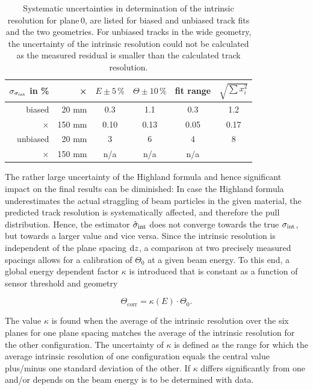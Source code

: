 \begin{table}[tbp]
 \begin{center}
  \begin{tabular}{r|r|c|c|c||c}
  $\sigma_{\sigma_{\textrm{int}}}$ in \% & × & $E\pm5\,\%$ & $\Theta\pm10\,\%$ & fit range & $\sqrt{\sum x_i^2}$\\ \hline
  biased   &  20 mm & 0.3 & 1.1  & 0.3 & 1.2 \\
  ×        & 150 mm & 0.10 & 0.13 & 0.05 & 0.17\\
  unbiased &  20 mm &   3 & 6    & 4  & 8\\
  ×        & 150 mm & n/a & n/a  & n/a & \\
  \end{tabular}
    \caption[Systematic uncertainties for plane\,0]{Systematic uncertainties in determination of the intrinsic resolution for plane\,0, are listed for biased and unbiased track fits and the two geometries.
  For unbiased tracks in the wide geometry, the uncertainty of the intrinsic resolution could not be calculated as the measured residual is smaller than the calculated track resolution.}
  \label{tab:uncerts}
 \end{center}
\end{table}

The rather large uncertainty of the Highland formula and hence significant impact on the final results can be diminished: 
In case the Highland formula underestimates the actual straggling of beam particles in the given material, the predicted track resolution is systematically affected, and therefore the pull distribution. 
Hence, the estimator $\hat{\sigma}_{\textrm{int}}$ does not converge towards the true $\sigma_{\textrm{int}}$, but towards a larger value and vice versa. 
Since the intrinsic resolution is independent of the plane spacing $\textrm{d}z$, a comparison at two precisely measured spacings allows for a calibration of $\Theta_0$ at a given beam energy. 
To this end, a global energy dependent factor $\kappa$ is introduced that is constant as a function of sensor threshold and geometry

\begin{equation}
 \Theta_{\textrm{corr}} = \kappa(E) \cdot \Theta_0.
 \label{eq:thetacorr}
\end{equation}

\noindent
The value $\kappa$ is found when the average of the intrinsic resolution over the six planes for one plane spacing matches the average of the intrinsic resolution for the other configuration. 
The uncertainty of $\kappa$ is defined as the range for which the average intrinsic resolution of one configuration equals the central value plus/minus one standard deviation of the other. 
If $\kappa$ differs significantly from one and/or depends on the beam energy is to be determined with data. 


